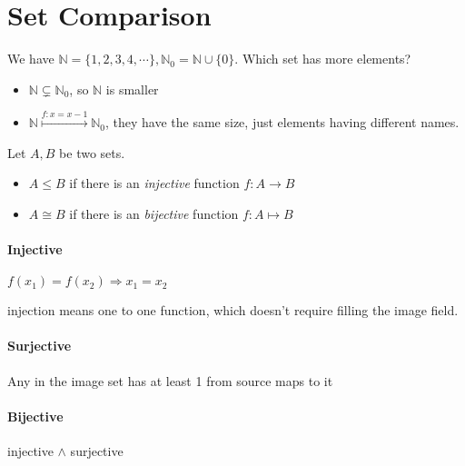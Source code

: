 \section{Set Comparison}
We have
\(\mathbb{N} = \{1,2,3,4,\cdots\}, \mathbb{N}_0 = \mathbb{N} \cup \{0\}\).
Which set has more elements?

\begin{itemize}
\item
  \(\mathbb{N} \subsetneq \mathbb{N}_0\), so \(\mathbb{N}\) is smaller
\item
  \(\mathbb{N} \overset{f: x=x-1}{\mapsto} \mathbb{N}_0\), they have the same size,
  just elements having different names.
\end{itemize}

\begin{definition}
Let $A, B$ be two sets.

\begin{itemize}
\item
  \(A \le B\) if there is an \emph{injective} function
  \(f : A \rightarrow B\)
\item
  \(A \cong B\) if there is an \emph{bijective} function
  \(f: A \mapsto B\)
\end{itemize}

\paragraph{Injective} \(f(x_1)=f(x_2) \Rightarrow x_1 = x_2\)

injection means one to one function, which doesn't require filling the
image field.

\paragraph{Surjective} Any in the image set has at least 1 from source
maps to it

\paragraph{Bijective} injective \(\land\) surjective

\end{definition}
